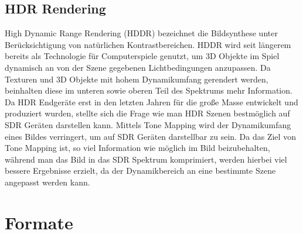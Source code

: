 \documentclass[conference]{IEEEtran}
\begin{document}
\subsection{HDR Rendering}
High Dynamic Range Rendering (HDDR) bezeichnet die Bildsynthese unter Berücksichtigung von natürlichen Kontrastbereichen. HDDR wird seit längerem bereits als Technologie für Computerspiele genutzt, um 3D Objekte im Spiel dynamisch an von der Szene gegebenen Lichtbedingungen anzupassen. Da Texturen und 3D Objekte mit hohem Dynamikumfang gerendert werden, beinhalten diese im unteren sowie oberen Teil des Spektrums mehr Information. Da HDR Endgeräte erst in den letzten Jahren für die große Masse entwickelt und produziert wurden, stellte sich die Frage wie man HDR Szenen bestmöglich auf SDR Geräten darstellen kann. Mittels Tone Mapping wird der Dynamikumfang eines Bildes verringert, um auf SDR Geräten darstellbar zu sein. Da das Ziel von Tone Mapping ist, so viel Information wie möglich im Bild beizubehalten, während man das Bild in das SDR Spektrum komprimiert, werden hierbei viel bessere Ergebnisse erzielt, da der Dynamikbereich an eine bestimmte Szene angepasst werden kann.
\section{Formate}
\end{document}
